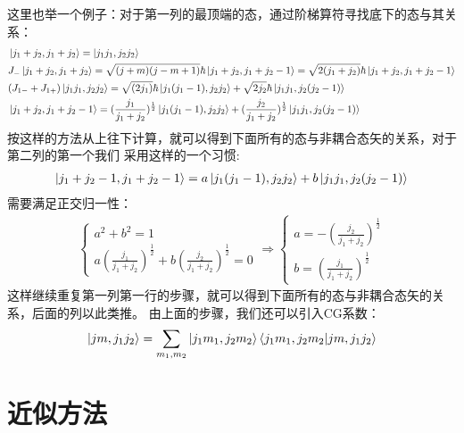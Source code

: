 \documentclass[UTF8]{article}
\numberwithin{equation}{section}
\begin{document}
这里也举一个例子：对于第一列的最顶端的态，通过阶梯算符寻找底下的态与其关系：
\begin{align*}
     & \ket{j_1+j_2,j_1+j_2}=\ket{j_1j_1,j_2j_2}                                                                                                   \\
     & J_-\ket{j_1+j_2,j_1+j_2}=\sqrt{(j+m)(j-m+1)}\hbar\ket{j_1+j_2,j_1+j_2-1}=\sqrt{2(j_1+j_2)}\hbar\ket{j_1+j_2,j_1+j_2-1}                      \\
     & (J_{1-}+J_{1+})\ket{j_1j_1,j_2j_2}=\sqrt{(2j_1)}\hbar \ket{j_1(j_1-1),j_2j_2}+\sqrt{2j_2}\hbar \ket{j_1j_1,j_2(j_2-1)}                      \\
     & \ket{j_1+j_2,j_1+j_2-1}=(\frac{j_1}{j_1+j_2})^{\frac{1}{2}}\ket{j_1(j_1-1),j_2j_2}+(\frac{j_2}{j_1+j_2})^\frac{1}{2}\ket{j_1j_1,j_2(j_2-1)}
\end{align*}
按这样的方法从上往下计算，就可以得到下面所有的态与非耦合态矢的关系，对于第二列的第一个我们
采用这样的一个习惯:
\begin{align*}
    \ket{j_1+j_2-1,j_1+j_2-1}=a\ket{j_1(j_1-1),j_2j_2}+b\ket{j_1j_1,j_2(j_2-1)}
\end{align*}
需要满足正交归一性：
\begin{align*}
    \begin{cases}
        a^2+b^2=1 \\
        a(\frac{j_1}{j_1+j_2})^{\frac{1}{2}}+b(\frac{j_2}{j_1+j_2})^\frac{1}{2}=0
    \end{cases}
    \Rightarrow \begin{cases}
                    a=-(\frac{j_2}{j_1+j_2})^\frac{1}{2} \\
                    b=(\frac{j_1}{j_1+j_2})^{\frac{1}{2}}
                \end{cases}
\end{align*}
这样继续重复第一列第一行的步骤，就可以得到下面所有的态与非耦合态矢的关系，后面的列以此类推。
由上面的步骤，我们还可以引入CG系数：
\begin{align*}
    \ket{jm,j_1j_2}=\sum_{m_1,m_2}\ket{j_1m_1,j_2m_2}\braket{j_1m_1,j_2m_2}{jm,j_1j_2}
\end{align*}
\section{近似方法}
\end{document}
